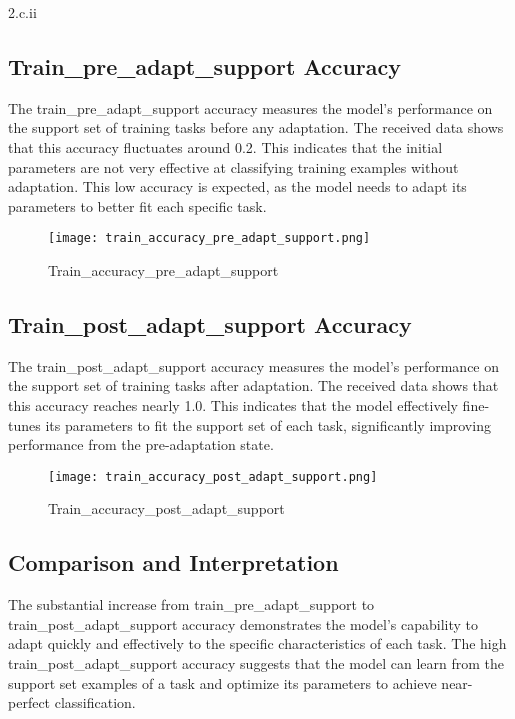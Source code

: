 \LARGE
2.c.ii
\normalsize

\begin{answer}
    \subsection*{Train\_pre\_adapt\_support Accuracy}

The train\_pre\_adapt\_support accuracy measures the model's performance on the support set of training tasks before any adaptation. The received data shows that this accuracy fluctuates around 0.2. This indicates that the initial parameters are not very effective at classifying training examples without adaptation. This low accuracy is expected, as the model needs to adapt its parameters to better fit each specific task.

\begin{figure}[h!]
    \centering
    \texttt{[image: train\_accuracy\_pre\_adapt\_support.png]}
    \caption{Train\_accuracy\_pre\_adapt\_support}
\end{figure}

\subsection*{Train\_post\_adapt\_support Accuracy}

The train\_post\_adapt\_support accuracy measures the model's performance on the support set of training tasks after adaptation. The received data shows that this accuracy reaches nearly 1.0. This indicates that the model effectively fine-tunes its parameters to fit the support set of each task, significantly improving performance from the pre-adaptation state.

\begin{figure}[h!]
    \centering
    \texttt{[image: train\_accuracy\_post\_adapt\_support.png]}
    \caption{Train\_accuracy\_post\_adapt\_support}
\end{figure}

\subsection*{Comparison and Interpretation}

The substantial increase from train\_pre\_adapt\_support to train\_post\_adapt\_support accuracy demonstrates the model's capability to adapt quickly and effectively to the specific characteristics of each task. The high train\_post\_adapt\_support accuracy suggests that the model can learn from the support set examples of a task and optimize its parameters to achieve near-perfect classification.
\end{answer}

